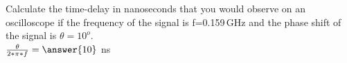 \documentclass{ximera}
\begin{document}
%                   

  
\begin{question}  
Calculate the time-delay in nanoseconds that you would observe on an oscilloscope if the frequency of the signal is f=0.159\,GHz and the phase shift of the signal is $\theta=10^o$. \\
$ \frac{\theta}{2*\pi*f}= \answer{10}$  ns
\end{question} 
\end{document}

